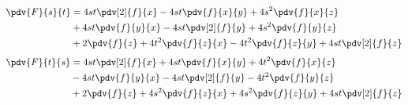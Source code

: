 \documentclass[12pt,a4paper,reqno]{article}
\begin{document}
	\begin{equation}
		\begin{split}
			\pdv{F}{s}{t} &= 4st\pdv[2]{f}{x}-4st\pdv{f}{x}{y}+4s^{2}\pdv{f}{x}{z}\\
						  &+4st\pdv{f}{y}{x}-4st\pdv[2]{f}{y}+4s^{2}\pdv{f}{y}{z}\\
						  &+2\pdv{f}{z}+4t^{2}\pdv{f}{z}{x}-4t^{2}\pdv{f}{z}{y}+4st\pdv[2]{f}{z}
		\end{split}
	\end{equation}
	\begin{equation}
		\begin{split}
			\pdv{F}{t}{s} &= 4st\pdv[2]{f}{x}+4st\pdv{f}{x}{y}+4t^{2}\pdv{f}{x}{z}\\
						  &-4st\pdv{f}{y}{x}-4st\pdv[2]{f}{y}-4t^{2}\pdv{f}{y}{z}\\
						  &+2\pdv{f}{z}+4s^{2}\pdv{f}{z}{x}+4s^{2}\pdv{f}{z}{y}+4st\pdv[2]{f}{z}
		\end{split}
	\end{equation}
	
\end{document}
